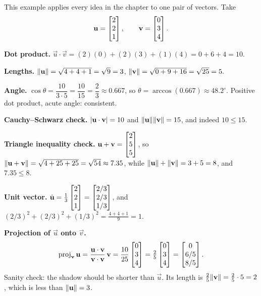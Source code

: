This example applies every idea in the chapter to one pair of vectors. Take
\[
  \mathbf{u} = \begin{bmatrix}2\\2\\1\end{bmatrix}, \qquad \mathbf{v} = \begin{bmatrix}0\\3\\4\end{bmatrix}.
\]

\textbf{Dot product.}
$\vec u\cdot\vec v = (2)(0)+(2)(3)+(1)(4) = 0+6+4 = 10.$

\textbf{Lengths.}
$\lVert\mathbf{u}\rVert = \sqrt{4+4+1} = \sqrt9 = 3$, \quad
$\lVert\mathbf{v}\rVert = \sqrt{0+9+16} = \sqrt{25} = 5.$

\textbf{Angle.}
$\cos\theta = \dfrac{10}{3\cdot5} = \dfrac{10}{15} = \dfrac23 \approx 0.667$,
so $\theta = \arccos(0.667)\approx 48.2^\circ$. Positive dot product, acute angle:
consistent.

\textbf{Cauchy--Schwarz check.}
$\lvert\mathbf{u}\cdot\mathbf{v}\rvert = 10$ and $\lVert\mathbf{u}\rVert\lVert\mathbf{v}\rVert = 15$, and indeed
$10 \le 15$. \checkmark

\textbf{Triangle inequality check.}
$\mathbf{u}+\mathbf{v} = \begin{bmatrix}2\\5\\5\end{bmatrix}$, so $\lVert\mathbf{u}+\mathbf{v}\rVert = \sqrt{4+25+25}
= \sqrt{54}\approx 7.35$, while $\lVert\mathbf{u}\rVert+\lVert\mathbf{v}\rVert = 3+5 = 8$, and
$7.35 \le 8$. \checkmark

\textbf{Unit vector.}
$\hat{\mathbf{u}} = \tfrac13\begin{bmatrix}2\\2\\1\end{bmatrix} = \begin{bmatrix}2/3\\2/3\\1/3\end{bmatrix}$, and
$(2/3)^2+(2/3)^2+(1/3)^2 = \tfrac{4+4+1}{9} = 1.$ \checkmark

\textbf{Projection of $\vec u$ onto $\vec v$.}
\[
  \operatorname{proj}_{\mathbf{v}}\mathbf{u}
   = \frac{\mathbf{u}\cdot\mathbf{v}}{\mathbf{v}\cdot\mathbf{v}}\,\mathbf{v}
   = \frac{10}{25}\begin{bmatrix}0\\3\\4\end{bmatrix}
   = \tfrac25\begin{bmatrix}0\\3\\4\end{bmatrix}
   = \begin{bmatrix}0\\6/5\\8/5\end{bmatrix}.
\]
Sanity check: the shadow should be shorter than $\vec u$. Its length is
$\tfrac25\lVert\mathbf{v}\rVert = \tfrac25\cdot 5 = 2$, which is less than
$\lVert\mathbf{u}\rVert=3$. \checkmark

